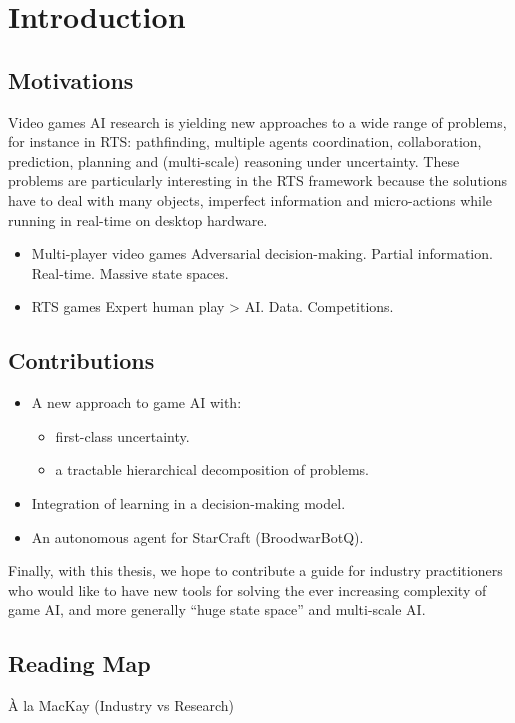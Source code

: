 \chapter{Introduction}

\adjustmtc
\chaptertoc

\section{Motivations}

Video games AI research is yielding new approaches to a wide range of problems, for instance in RTS: pathfinding, multiple agents coordination, collaboration, prediction, planning and (multi-scale) reasoning under uncertainty. These problems are particularly interesting in the RTS framework because the solutions have to deal with many objects, imperfect information and micro-actions while running in real-time on desktop hardware.

\begin{itemize}
\item Multi-player video games
Adversarial decision-making. Partial information. Real-time. Massive state spaces.
\item RTS games
Expert human play > AI. Data. Competitions.
\end{itemize}

\section{Contributions}

\begin{itemize}
\item A new approach to game AI with:
\begin{itemize}
\item first-class uncertainty.
\item a tractable hierarchical decomposition of problems.
\end{itemize}
\item Integration of learning in a decision-making model. 
\item An autonomous agent for StarCraft (BroodwarBotQ).
\end{itemize}

Finally, with this thesis, we hope to contribute a guide for industry practitioners who would like to have new tools for solving the ever increasing complexity of game AI, and more generally ``huge state space'' and multi-scale AI.




\section{Reading Map}

À la MacKay (Industry vs Research)


